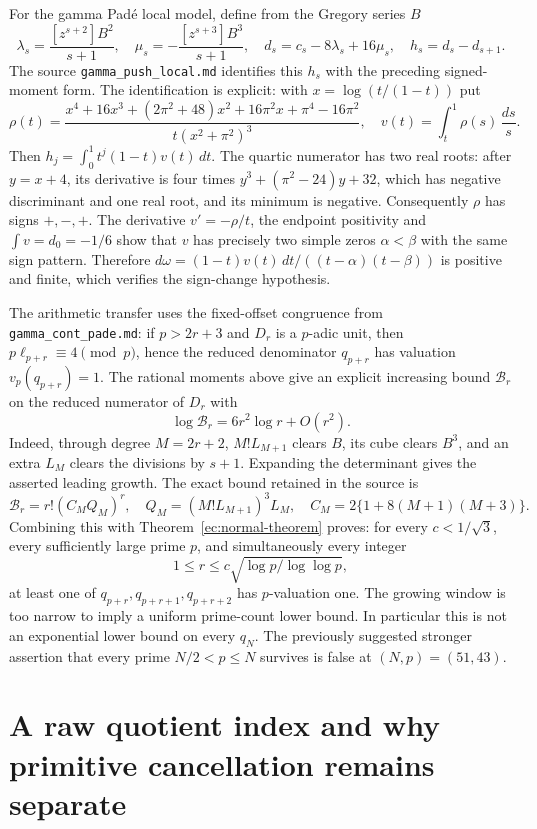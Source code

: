 \documentclass[11pt,a4paper]{article}
\theoremstyle{definition}
\theoremstyle{remark}
\numberwithin{equation}{section}
\begin{document}
For the gamma Pad\'e local model, define from the Gregory series $B$
\[
 \lambda_s=\frac{[z^{s+2}]B^2}{s+1},\quad
 \mu_s=-\frac{[z^{s+3}]B^3}{s+1},\quad
 d_s=c_s-8\lambda_s+16\mu_s,\quad h_s=d_s-d_{s+1}.
\]
The source \texttt{gamma\_push\_local.md} identifies this $h_s$ with
the preceding signed-moment form.  The identification is explicit:
with $x=\log(t/(1-t))$ put
\[
 \rho(t)=\frac{x^4+16x^3+(2\pi^2+48)x^2+16\pi^2x+
                    \pi^4-16\pi^2}{t(x^2+\pi^2)^3},\quad
 v(t)=\int_t^1\rho(s)\,\frac{ds}s.
\]
Then $h_j=\int_0^1t^j(1-t)v(t)\,dt$.  The quartic numerator has two
real roots: after $y=x+4$, its derivative is four times
$y^3+(\pi^2-24)y+32$, which has negative discriminant and one real
root, and its minimum is negative.  Consequently $\rho$ has signs
$+,-,+$.  The derivative $v'=-\rho/t$, the endpoint positivity and
$\int v=d_0=-1/6$ show that $v$ has precisely two simple zeros
$\alpha<\beta$ with the same sign pattern.  Therefore
$d\omega=(1-t)v(t)\,dt/((t-\alpha)(t-\beta))$ is positive and finite,
which verifies the sign-change hypothesis.

The arithmetic transfer uses the fixed-offset congruence from
\texttt{gamma\_cont\_pade.md}: if $p>2r+3$ and $D_r$ is a $p$-adic
unit, then $p\ell_{p+r}\equiv4\pmod p$, hence the reduced denominator
$q_{p+r}$ has valuation $v_p(q_{p+r})=1$.  The rational moments above
give an explicit increasing bound $\mathcal B_r$ on the reduced numerator
of $D_r$ with
\[
 \log\mathcal B_r=6r^2\log r+O(r^2).
\]
Indeed, through degree $M=2r+2$, $M!L_{M+1}$ clears $B$, its cube
clears $B^3$, and an extra $L_M$ clears the divisions by $s+1$.
Expanding the determinant gives the asserted leading growth.  The exact
bound retained in the source is
\[
 \mathcal B_r=r!(C_MQ_M)^r,\quad
 Q_M=(M!L_{M+1})^3L_M,\quad
 C_M=2\{1+8(M+1)(M+3)\}.
\]
Combining this with Theorem~\ref{ec:normal-theorem} proves: for every
$c<1/\sqrt3$, every sufficiently large prime $p$, and simultaneously
every integer
\[
 1\le r\le c\sqrt{\log p/\log\log p},
\]
at least one of $q_{p+r},q_{p+r+1},q_{p+r+2}$ has $p$-valuation one.
The growing window is too narrow to imply a uniform prime-count lower
bound.  In particular this is not an exponential lower bound on every
$q_N$.  The previously suggested stronger assertion that every prime
$N/2<p\le N$ survives is false at $(N,p)=(51,43)$.

\section{A raw quotient index and why primitive cancellation remains separate}
\label{ec:quotient-index}
\end{document}
